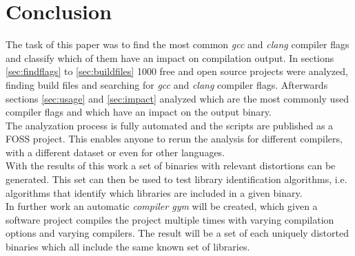\documentclass[9pt, a4paper, twocolumn]{article}
\begin{document}
\section{Conclusion}
The task of this paper was to find the most common \textit{gcc} and \textit{clang} compiler flags and classify which of them have an impact on compilation output. In sections \ref{sec:findflags} to 
\ref{sec:buildfiles} 1000 free and open source projects were analyzed, finding build files and searching for \textit{gcc} and \textit{clang} compiler flags. Afterwards sections \ref{sec:usage} and \ref{sec:impact} analyzed which are the most commonly used compiler flags and which have an impact on the output binary. \\
The analyzation process is fully automated and the scripts are published as a FOSS project\cite{compiler-flag-ranking}. This enables anyone to rerun the analysis for different compilers, with a different dataset or even for other languages. \\
With the results of this work a set of binaries with relevant distortions can be generated. This set can then be used to test library identification algorithms, i.e. algorithms that identify which libraries are included in a given binary. \\
In further work an automatic \textit{compiler gym} will be created, which given a software project compiles the project multiple times with varying compilation options and varying compilers. The result will be a set of each uniquely distorted binaries which all include the same known set of libraries.
\end{document}
